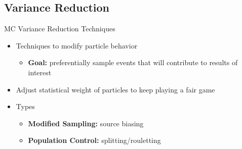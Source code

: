 \documentclass{beamer}
\begin{document}
\begin{frame}
\begin{columns}
\end{columns}
\end{frame}

%

\subsection{Variance Reduction}
\begin{frame}{MC Variance Reduction Techniques}
\begin{itemize}
\item{Techniques to modify particle behavior}
   \begin{itemize}
	\item{\textbf{Goal:} preferentially sample events that will contribute to results of interest}
   \end{itemize}
\item{Adjust statistical weight of particles to keep playing a fair game}
\item{Types}
	\begin{itemize}
		\item{\textbf{Modified Sampling:} source biasing}
		\item{\textbf{Population Control:} splitting/rouletting}
	\end{itemize}
\end{itemize}
\end{frame}
\end{document}
